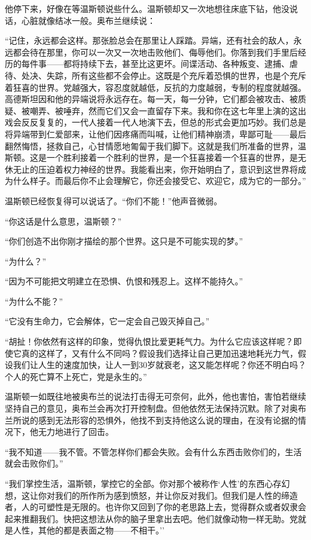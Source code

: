 他停下来，好像在等温斯顿说些什么。温斯顿却又一次地想往床底下钻，他没说话，心脏就像结冰一般。奥布兰继续说：

``记住，永远都会这样。那张脸总会在那里让人踩踏。异端，还有社会的敌人，永远都会待在那里，你可以一次又一次地击败他们、侮辱他们。你落到我们手里后经历的每件事------都将持续下去，甚至比这更坏。间谍活动、各种叛变、逮捕、虐待、处决、失踪，所有这些都不会停止。这既是个充斥着恐惧的世界，也是个充斥着狂喜的世界。党越强大，容忍度就越低，反抗的力度越弱，专制的程度就越强。高德斯坦因和他的异端说将永远存在。每一天，每一分钟，它们都会被攻击、被质疑、被嘲弄、被唾弃，然而它们又会一直留存下来。我和你在这七年里上演的这出戏会反反复复的，一代人接着一代人地演下去，但总的形式会更加巧妙。我们总是将异端带到仁爱部来，让他们因疼痛而叫喊，让他们精神崩溃，卑鄙可耻------最后翻然悔悟，拯救自己，心甘情愿地匍匐于我们脚下。这就是我们所准备的世界，温斯顿。这是一个胜利接着一个胜利的世界，是一个狂喜接着一个狂喜的世界，是无休无止的压迫着权力神经的世界。我能看出来，你开始明白了，意识到这世界将成为什么样子。而最后你不止会理解它，你还会接受它、欢迎它，成为它的一部分。''

温斯顿已经恢复得可以说话了。``你们不能！''他声音微弱。

``你这话是什么意思，温斯顿？''

``你们创造不出你刚才描绘的那个世界。这只是不可能实现的梦。''

``为什么？''

``因为不可能把文明建立在恐惧、仇恨和残忍上。这样不能持久。''

``为什么不能？''

``它没有生命力，它会解体，它一定会自己毁灭掉自己。''

``胡扯！你依然有这样的印象，觉得仇恨比爱更耗气力。为什么它应该这样呢？即使它真的这样了，又有什么不同吗？假设我们选择让自己更加迅速地耗光力气，假设我们让人生的速度加快，让人一到30岁就衰老，这又能怎样呢？你还不明白吗？个人的死亡算不上死亡，党是永生的。''

温斯顿一如既往地被奥布兰的说法打击得无可奈何，此外，他也害怕，害怕若继续坚持自己的意见，奥布兰会再次打开控制盘。但他依然无法保持沉默。除了对奥布兰所说的感到无法形容的恐惧外，他找不到支持他这么说的理由，在没有论据的情况下，他无力地进行了回击。

``我不知道------我不管。不管怎样你们都会失败。会有什么东西击败你们的，生活就会击败你们。''

``我们掌控生活，温斯顿，掌控它的全部。你对那个被称作`人性'的东西心存幻想，这让你对我们的所作所为感到愤怒，并让你反对我们。但我们是人性的缔造者，人的可塑性是无限的。也许你又回到了你的老思路上去，觉得群众或者奴隶会起来推翻我们。快把这想法从你的脑子里拿出去吧。他们就像动物一样无助。党就是人性，其他的都是表面之物------不相干。''


